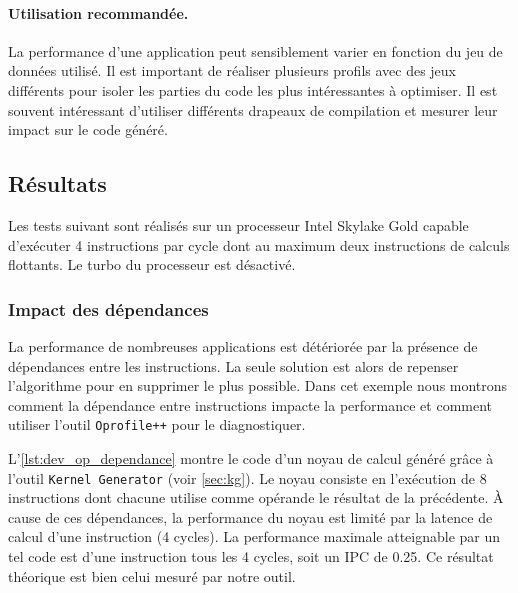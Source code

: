         \paragraph{Utilisation recommandée.} La performance d'une application peut sensiblement varier en fonction du jeu de données utilisé. Il est important de réaliser plusieurs profils avec des jeux différents pour isoler les parties du code les plus intéressantes à optimiser. Il est souvent intéressant d'utiliser différents drapeaux de compilation et mesurer leur impact sur le code généré. 
        

\subsection{Résultats}

    Les tests suivant sont réalisés sur un processeur Intel Skylake Gold capable d'exécuter 4 instructions par cycle dont au maximum deux instructions de calculs flottants. Le turbo du processeur est désactivé. 


    \subsubsection{Impact des dépendances}
        La performance de nombreuses applications est détériorée par la présence de dépendances entre les instructions. La seule solution est alors de repenser l'algorithme pour en supprimer le plus possible. Dans cet exemple nous montrons comment la dépendance entre instructions impacte la performance et comment utiliser l'outil \verb=Oprofile++= pour le diagnostiquer. 
        
        L'\autoref{lst:dev_op_dependance} montre le code d'un noyau de calcul généré grâce à l'outil \verb|Kernel Generator| (voir \autoref{sec:kg}). Le noyau consiste en l'exécution de 8 instructions dont chacune utilise comme opérande le résultat de la précédente. À cause de ces dépendances, la performance du noyau est limité par la latence de calcul d'une instruction (4 cycles). La performance maximale atteignable par un tel code est d’une instruction tous les 4 cycles, soit un IPC de 0.25. Ce résultat théorique est bien celui mesuré par notre outil. 
        

